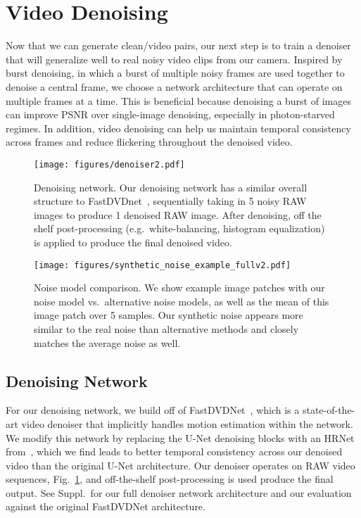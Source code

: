 \documentclass[final]{cvpr}
\begin{document}
\section{Video Denoising}
\label{sec:denoiser}
Now that we can generate clean/video pairs, our next step is to train a denoiser that will generalize well to real noisy video clips from our camera. Inspired by burst denoising, in which a burst of multiple noisy frames are used together to denoise a central frame, we choose a network architecture that can operate on multiple frames at a time. This is beneficial because denoising a burst of images can improve PSNR over single-image denoising, especially in photon-starved regimes.  In addition, video denoising can help us maintain temporal consistency across frames and reduce flickering throughout the denoised video. 

\begin{figure}[thb]
\centering
\texttt{[image: figures/denoiser2.pdf]}
   \caption{Denoising network. Our denoising network has a similar overall structure to FastDVDnet~\cite{tassano2020fastdvdnet}, sequentially taking in 5 noisy RAW images to produce 1 denoised RAW image. After denoising, off the shelf post-processing (e.g.\ white-balancing, histogram equalization) is applied to produce the final denoised video. }
\label{fig:denoiser}
\vspace{-4mm}
\end{figure}

\begin{figure*}[!thb]
\centering
\texttt{[image: figures/synthetic\_noise\_example\_fullv2.pdf]}
   \caption{Noise model comparison. We show example image patches with our noise model vs.\ alternative noise models, as well as the mean of this image patch over 5 samples. Our synthetic noise appears more similar to the real noise than alternative methods and closely matches the average noise as well.}
\label{fig:noise_comparison}
\vspace{-4mm}
\end{figure*}

\subsection{Denoising Network}
For our denoising network, we build off of FastDVDNet~\cite{tassano2020fastdvdnet}, which is a state-of-the-art video denoiser that implicitly handles motion estimation within the network. We modify this network by replacing the U-Net denoising blocks with an HRNet from~\cite{sun2019deep}, which we find leads to better temporal consistency across our denoised video than the original U-Net architecture. Our denoiser operates on RAW video sequences, Fig.~\ref{fig:denoiser}, and off-the-shelf post-processing is used produce the final output. See Suppl.\ for our full denoiser network architecture and our evaluation against the original FastDVDNet architecture.
\end{document}
